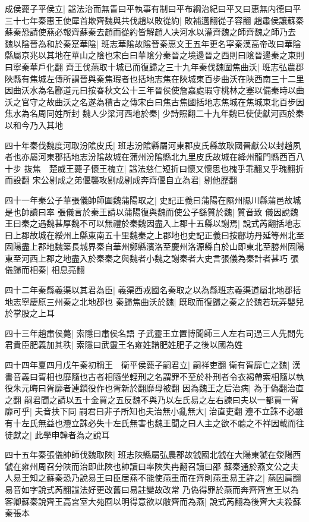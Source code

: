 成侯薨子平侯立|{
	諡法治而無眚曰平執事有制曰平布綱治紀曰平又曰惠無内德曰平}
三十七年秦惠王使犀首欺齊魏與共伐趙以敗從約|{
	敗補邁翻從子容翻}
趙肅侯讓蘇秦蘇秦恐請使燕必報齊蘇秦去趙而從約皆解趙人决河水以灌齊魏之師齊魏之師乃去　魏以陰晉為和於秦寔華陰|{
	班志華隂故隂晉秦惠文王五年更名寜秦漢高帝改曰華陰縣屬京兆以其地在華山之陰也宋白曰華隂分秦晉之境邊晉之西則曰隂晉邊秦之東則曰寧秦華戶化翻}
齊王伐燕取十城已而復歸之三十九年秦伐魏圍焦曲沃|{
	班志弘農郡陜縣有焦城左傳所謂晉與秦焦瑕者也括地志焦在陜城東百步曲沃在陜西南三十二里因曲沃水為名酈道元曰按春秋文公十三年晉侯使詹嘉處瑕守桃林之塞以備秦時以曲沃之官守之故曲沃之名遂為積古之傳宋白曰焦古焦國括地志焦城在焦城東北百步因焦水為名周同姓所封}
魏人少梁河西地於秦|{
	少詩照翻二十九年魏已使使獻河西於秦以和今乃入其地}


四十年秦伐魏度河取汾隂皮氏|{
	班志汾隂縣屬河東郡皮氏縣故耿國晉獻公以封趙夙者也亦屬河東郡括地志汾隂故城在蒲州汾隂縣北九里皮氏故城在絳州龍門縣西百八十步}
抜焦　楚威王薨子懷王槐立|{
	諡法慈仁短折曰懷又懷思也槐乎乖翻又乎瑰翻折而設翻}
宋公剔成之弟偃襲攻剔成剔成奔齊偃自立為君|{
	剔他歷翻}


四十一年秦公子華張儀帥師圍魏蒲陽取之|{
	史記正義曰蒲陽在隰州隰川縣蒲邑故城是也帥讀曰率}
張儀言於秦王請以蒲陽復與魏而使公子繇質於魏|{
	質音致}
儀因說魏王曰秦之遇魏甚厚魏不可以無禮於秦魏因盡入上郡十五縣以謝焉|{
	說式芮翻括地志曰上郡故城在綏州上縣東南五十里魏秦之上郡地也史記正義曰按鄜坊丹延等州北至固陽盡上郡地魏築長城界秦自華州鄭縣濱洛至慶州洛源縣白於山即東北至勝州固陽東至河西上郡之地盡入於秦秦之與魏者小魏之謝秦者大史言張儀為秦計者甚巧}
張儀歸而相秦|{
	相息亮翻}


四十二年秦縣義渠以其君為臣|{
	義渠西戎國名秦取之以為縣班志義渠道屬北地郡括地志寧慶原三州秦之北地郡也}
秦歸焦曲沃於魏|{
	既取而復歸之秦之於魏若玩弄嬰兒於掌股之上耳}


四十三年趙肅侯薨|{
	索隱曰肅侯名語}
子武靈王立置博聞師三人左右司過三人先問先君貴臣肥義加其秩|{
	索隱曰武靈王名雍姓譜肥姓肥子之後以國為姓}


四十四年夏四月戊午秦初稱王　衛平侯薨子嗣君立|{
	嗣祥吏翻}
衛有胥靡亡之魏|{
	漢書音義曰胥相也靡隨也古者相隨坐輕刑之名謂罪不至於朴刑者令衣褐帶索相隨以執役朱元晦曰胥靡者連鎻役作也胥新於翻靡母被翻}
因為魏王之后治病|{
	為于偽翻治直之翻}
嗣君聞之請以五十金買之五反魏不與乃以左氏易之左右諫曰夫以一都買一胥靡可乎|{
	夫音扶下同}
嗣君曰非子所知也夫治無小亂無大|{
	治直吏翻}
灋不立誅不必雖有十左氏無益也灋立誅必失十左氏無害也魏王聞之曰人主之欲不聼之不祥因載而往徒獻之|{
	此學申韓者為之說耳}


四十五年秦張儀帥師伐魏取陜|{
	班志陜縣屬弘農郡故虢國北虢在大陽東虢在滎陽西虢在雍州周召分陜而治即此陜也帥讀曰率陜失冉翻召讀曰邵}
蘇秦通於燕文公之夫人易王知之蘇秦恐乃說易王曰臣居燕不能使燕重而在齊則燕重易王許之|{
	燕因肩翻易音如字說式芮翻諡法好更改舊曰易註變故改常}
乃偽得罪於燕而奔齊齊宣王以為客卿蘇秦說齊王高宮室大苑囿以明得意欲以敝齊而為燕|{
	說式芮翻為後齊大夫殺蘇秦張本}


